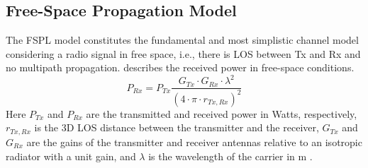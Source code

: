 \subsection{Free-Space Propagation Model} \label{Free space propagation model}
The FSPL model constitutes the fundamental and most simplistic channel model considering a radio signal in free space, i.e., there is LOS between Tx and Rx and no multipath propagation.  describes the received power in free-space conditions.
\begin{equation} \label{Eq:Free space propagation}
	P_{Rx}= P_{Tx} \frac{G_{Tx} \cdot G_{Rx} \cdot \lambda^2 }{(4 \cdot \pi \cdot r_{Tx, Rx})^2}
\end{equation}
Here $P_{Tx}$ and $P_{Rx}$ are the transmitted and received power in Watts, respectively, $r_{Tx, Rx}$ is the 3D \ac{LOS} distance between the transmitter and the receiver, $G_{Tx}$ and $G_{Rx}$ are the gains of the transmitter and receiver antennas relative to an isotropic radiator with a unit gain, and $\lambda$ is the wavelength of the carrier in \si{\meter} \cite{9205413}.

